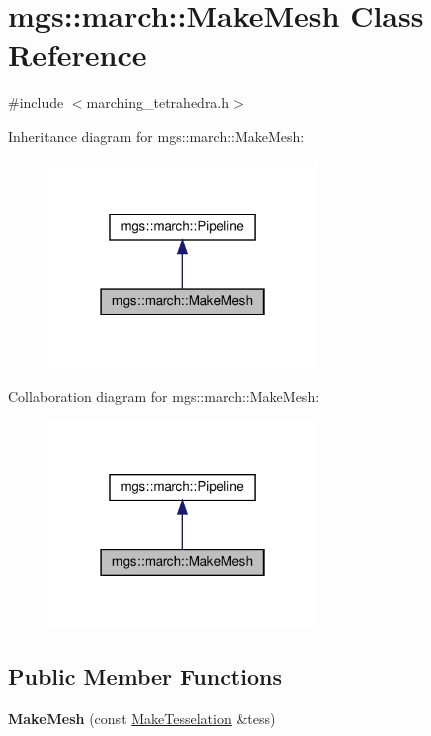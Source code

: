 \hypertarget{classmgs_1_1march_1_1MakeMesh}{}\section{mgs\+:\+:march\+:\+:Make\+Mesh Class Reference}
\label{classmgs_1_1march_1_1MakeMesh}


{\ttfamily \#include $<$marching\+\_\+tetrahedra.\+h$>$}



Inheritance diagram for mgs\+:\+:march\+:\+:Make\+Mesh\+:
\nopagebreak
\begin{figure}[H]
\begin{center}
\leavevmode
\includegraphics[width=202pt]{classmgs_1_1march_1_1MakeMesh__inherit__graph}
\end{center}
\end{figure}


Collaboration diagram for mgs\+:\+:march\+:\+:Make\+Mesh\+:
\nopagebreak
\begin{figure}[H]
\begin{center}
\leavevmode
\includegraphics[width=202pt]{classmgs_1_1march_1_1MakeMesh__coll__graph}
\end{center}
\end{figure}
\subsection*{Public Member Functions}
\begin{DoxyCompactItemize}
\item 
\mbox{\label{classmgs_1_1march_1_1MakeMesh_a75f2c9780b65330c095ebd8a2d89f148}} 
{\bfseries Make\+Mesh} (const \hyperlink{classmgs_1_1march_1_1MakeTesselation}{Make\+Tesselation} \&tess)
\end{DoxyCompactItemize}


